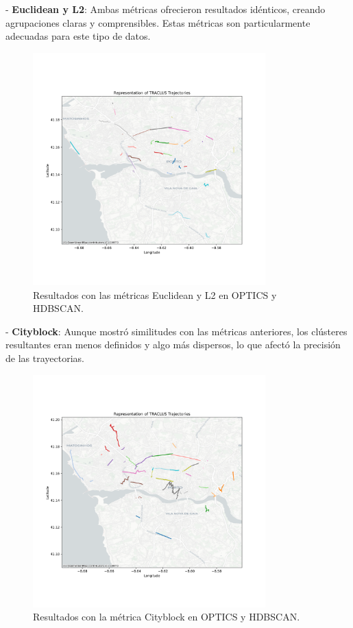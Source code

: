 \FloatBarrier

- \textbf{Euclidean y L2}: Ambas métricas ofrecieron resultados idénticos, creando agrupaciones claras y comprensibles. Estas métricas son particularmente adecuadas para este tipo de datos.

\begin{figure}[h!]
    \centering
    \includegraphics[width=0.8\textwidth]{img/Taxis/map_optics_l2.png}
    \caption{Resultados con las métricas Euclidean y L2 en OPTICS y HDBSCAN.}
    \label{fig:euclidean}
\end{figure}

\FloatBarrier

- \textbf{Cityblock}: Aunque mostró similitudes con las métricas anteriores, los clústeres resultantes eran menos definidos y algo más dispersos, lo que afectó la precisión de las trayectorias.

\begin{figure}[h!]
    \centering
    \includegraphics[width=0.8\textwidth]{img/Taxis/map_optics_city.png}
    \caption{Resultados con la métrica Cityblock en OPTICS y HDBSCAN.}
    \label{fig:cityblock}
\end{figure}

